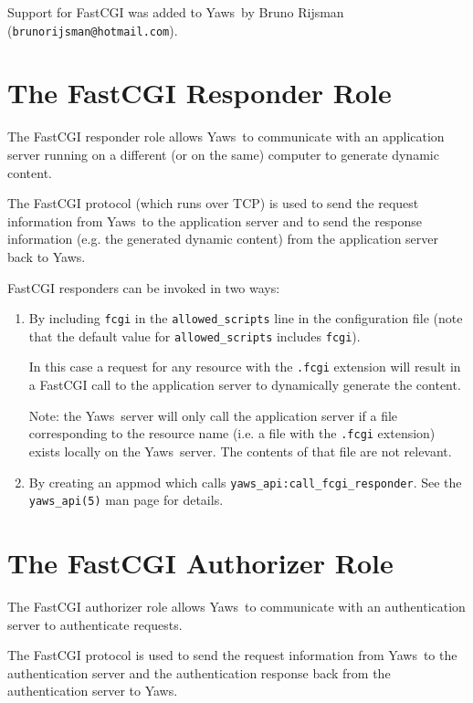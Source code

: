 \documentclass[11pt,oneside,english]{book}
\newcommand{\Yaws}            %
        {{\sc Yaws}}
\begin{document}
Support for FastCGI was added to \Yaws\  by Bruno Rijsman
(\verb+brunorijsman@hotmail.com+).

\section{The FastCGI Responder Role}

The FastCGI responder role allows \Yaws\  to communicate with an
application server running on a different (or on the same) computer
to generate dynamic content.

The FastCGI protocol (which runs over TCP) is used to send the request
information from \Yaws\  to the application server and to send the
response information (e.g. the generated dynamic content) from
the application server back to \Yaws{}.

FastCGI responders can be invoked in two ways:

\begin{enumerate}

\item
By including \verb+fcgi+ in the \verb+allowed_scripts+ line
in the configuration file (note that the default value for
\verb+allowed_scripts+ includes \verb+fcgi+).

In this case a request for any resource with the \verb+.fcgi+
extension will result in a FastCGI call to the application server to
dynamically generate the content.

Note: the \Yaws\  server will only call the application server if a file
corresponding to the resource name (i.e. a file with the \verb+.fcgi+
extension) exists locally on the \Yaws\  server. The contents of that
file are not relevant.

\item
By creating an appmod which calls \verb+yaws_api:call_fcgi_responder+.
See the \verb+yaws_api(5)+ man page for details.

\end{enumerate}

\section{The FastCGI Authorizer Role}

The FastCGI authorizer role allows \Yaws\  to communicate with an
authentication server to authenticate requests.

The FastCGI protocol is used to send the request information from
\Yaws\ to the authentication server and the authentication response
back from the authentication server to \Yaws{}.
\end{document}
